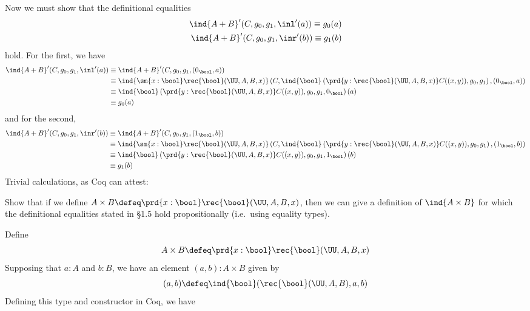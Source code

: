 Now we must show that the definitional equalities
\begin{align*}
  \ind{A+B}'(C, g_{0}, g_{1}, \inl'(a)) \equiv g_{0}(a) \\
  \ind{A+B}'(C, g_{0}, g_{1}, \inr'(b)) \equiv g_{1}(b)
\end{align*}
hold.  For the first, we have
\begin{align*}
  \ind{A+B}'(C, g_{0}, g_{1}, \inl'(a)) 
  &\equiv
  \ind{A+B}'(C, g_{0}, g_{1}, (0_{\bool}, a)) 
  \\&\equiv
  \ind{\sm{x:\bool}\rec{\bool}(\UU, A, B, x)}\left(
    C,
    \ind{\bool}\left(
      \prd{y:\rec{\bool}(\UU, A, B, x)} C((x, y)),
      g_{0},
      g_{1}
    \right),
    (0_{\bool}, a)
  \right)
  \\&\equiv
    \ind{\bool}\left(
      \prd{y:\rec{\bool}(\UU, A, B, x)} C((x, y)),
      g_{0},
      g_{1},
      0_{\bool}
    \right)(a)
  \\&\equiv
      g_{0}(a)
\end{align*}
and for the second,
\begin{align*}
  \ind{A+B}'(C, g_{0}, g_{1}, \inr'(b)) 
  &\equiv
  \ind{A+B}'(C, g_{0}, g_{1}, (1_{\bool}, b)) 
  \\&\equiv
  \ind{\sm{x:\bool}\rec{\bool}(\UU, A, B, x)}\left(
    C,
    \ind{\bool}\left(
      \prd{y:\rec{\bool}(\UU, A, B, x)} C((x, y)),
      g_{0},
      g_{1}
    \right),
    (1_{\bool}, b)
  \right)
  \\&\equiv
    \ind{\bool}\left(
      \prd{y:\rec{\bool}(\UU, A, B, x)} C((x, y)),
      g_{0},
      g_{1},
      1_{\bool}
    \right)(b)
  \\&\equiv
      g_{1}(b)
\end{align*}
Trivial calculations, as Coq can attest:

  Show that if we define $A \times B \defeq \prd{x : \bool}
\rec{\bool}(\UU, A, B, x)$, then we can give a definition of $\ind{A \times
  B}$ for which the definitional equalities stated in \S1.5 hold
propositionally (i.e.~using equality types).

\soln Define
\[
  A \times B \defeq \prd{x : \bool} \rec{\bool}(\UU, A, B, x)
\]
Supposing that $a : A$ and $b : B$, we have an element $(a, b) : A \times B$
given by
\[
  (a, b) \defeq \ind{\bool}(\rec{\bool}(\UU, A, B), a, b)
\]
Defining this type and constructor in Coq, we have

